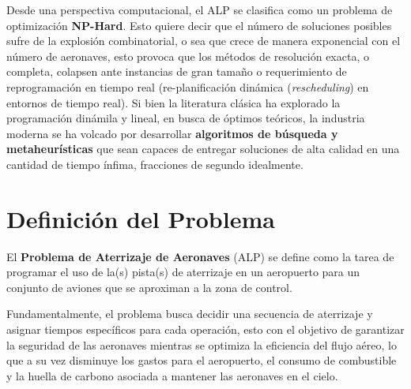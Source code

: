 \documentclass[letter, 10pt]{article}
\begin{document}
Desde una perspectiva computacional, el ALP se clasifica como un problema de optimizaci\'on \textbf{NP-Hard}. Esto quiere decir que el n\'umero de soluciones posibles sufre de la explosi\'on combinatorial, o sea que crece de manera exponencial con el n\'umero de aeronaves, esto provoca que los m\'etodos de resoluci\'on exacta, o completa, colapsen ante instancias de gran tama\~no o requerimiento de reprogramaci\'on en tiempo real (re-planificaci\'on din\'amica (\textit{rescheduling}) en entornos de tiempo real). Si bien la literatura cl\'asica ha explorado la programaci\'on din\'amila y lineal, en busca de \'optimos te\'oricos, la industria moderna se ha volcado por desarrollar \textbf{algoritmos de b\'usqueda y metaheur\'isticas} que sean capaces de entregar soluciones de alta calidad en una cantidad de tiempo \'infima, fracciones de segundo idealmente.

\section{Definici\'on del Problema}

El \textbf{Problema de Aterrizaje de Aeronaves} (ALP) se define como la tarea de programar el uso de la(s) pista(s) de aterrizaje en un aeropuerto para un conjunto de aviones que se aproximan a la zona de control.

Fundamentalmente, el problema busca decidir una secuencia de aterrizaje y asignar tiempos espec\'ificos para cada operaci\'on, esto con el objetivo de garantizar la seguridad de las aeronaves mientras se optimiza la eficiencia del flujo a\'ereo\cite{beasley2000}, lo que a su vez disminuye los gastos para el aeropuerto, el consumo de combustible y la huella de carbono asociada a mantener las aeronaves en el cielo.

\newpage
\end{document}
